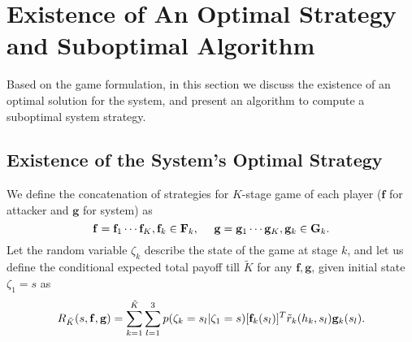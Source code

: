 \section{Existence of An Optimal Strategy and Suboptimal Algorithm}
\label{sec:ne1}

Based on the game formulation, in this section we discuss the existence of an optimal solution for the system, and present an algorithm to compute a suboptimal system strategy.%
 
\subsection{Existence of the System's Optimal Strategy}

We define the concatenation of strategies for $K$-stage game of each player ($\mathbf{f}$ for attacker and $\mathbf{g}$ for system) as%
\vspace{-4.5pt}
\begin{equation*}
\vspace{-4.5pt}
\mathbf{f}=\mathbf{f}_1\cdots \mathbf{f}_K,\mathbf{f}_{k} \in \mathbf{F}_{k},
~~~~\mathbf{g}=\mathbf{g}_{1}\cdots\mathbf{g}_K,\mathbf{g}_{k} \in \mathbf{G}_{k}.
\end{equation*}
Let the random variable $\zeta_{k}$ describe the state of the game at stage $k$, and  
let us define the conditional expected total payoff till $\tilde{K}$ for any $\mathbf{f},\mathbf{g}$, given initial state $\zeta_{1}=s$ as%
\footnotesize
\begin{equation*}\vspace{-5pt}
R_{\tilde{K}}(s, \mathbf{f}, \mathbf{g})%
=\sum \limits^{\tilde{K}}_{k=1}\sum_{l=1}^{3} p(\zeta_{k}=s_{l}|\zeta_{1} = s)[\mathbf{f}_{k}(s_{l})]^{T}\tilde{r}_{k}(h_{k},s_{l})\mathbf{g}_{k}(s_{l}).
\end{equation*}
